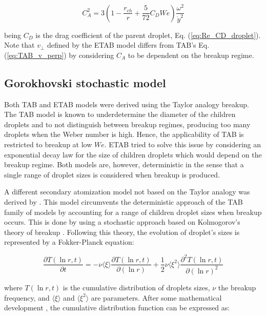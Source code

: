 \begin{equation}
C_A^2 = 3 \left( 1 - \frac{r_{ch}}{r} + \frac{5}{72} C_D We \right) \frac{\omega^2}{\dot{y}^2}
\end{equation}

being $C_D$ is the drag coefficient of the parent droplet, Eq. (\ref{eq:Re_CD_droplet}). Note that $v_\perp$ defined by the ETAB model differs from TAB's Eq. (\ref{eq:TAB_v_perp}) by considering $C_A$ to be dependent on the breakup regime.


\subsection{Gorokhovski stochastic model}
\label{subsec:ch4_goro_model}

Both TAB and ETAB models were derived using the Taylor analogy breakup. The TAB model is known to underdetermine the diameter of the children droplets and to not distinguish between breakup regimes, producing too many droplets when the Weber number is high. Hence, the applicability of TAB is restricted to breakup at low $We$. ETAB tried to solve this issue by considering an exponential decay law for the size of children droplets which would depend on the breakup regime. Both models are, however, deterministic in the sense that a single range of droplet sizes is considered when breakup is produced.

A different secondary atomization model not based on the Taylor analogy was derived by . This model circumvents the deterministic approach of the TAB family of models by accounting for a range of children droplet sizes when breakup occurs. This is done by using a stochastic approach based on Kolmogorov's theory of breakup . Following this theory, the evolution of droplet's sizes is represented by a Fokker-Planck equation: 

\begin{equation}
\frac{\partial T \left( \ln r, t \right)}{\partial t} = - \nu  \langle \xi \rangle  \frac{\partial T \left( \ln r, t \right)}{\partial \left( \ln r \right)} + \frac{1}{2} \nu  \langle \xi^2 \rangle  \frac{\partial^2 T \left( \ln r, t \right)}{\partial \left( \ln r \right)^2}
\end{equation}

where $T \left( \ln r, t \right)$ is the cumulative distribution of droplets sizes, $\nu$ the breakup frequency, and  $\langle \xi \rangle$ and $ \langle \xi^2 \rangle$ are parameters. After some mathematical development , the cumulative distribution function can be expressed as:

